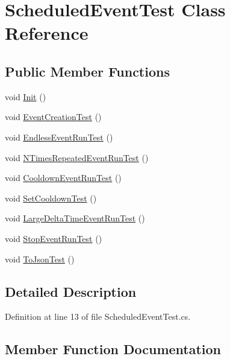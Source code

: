 \hypertarget{class_scheduled_event_test}{}\section{Scheduled\+Event\+Test Class Reference}
\label{class_scheduled_event_test}
\subsection*{Public Member Functions}
\begin{DoxyCompactItemize}
\item 
void \hyperlink{class_scheduled_event_test_a28bf66bb4e190d9b302157009e4230ba}{Init} ()
\item 
void \hyperlink{class_scheduled_event_test_a4560717049248abe6386df6bf4e26aa6}{Event\+Creation\+Test} ()
\item 
void \hyperlink{class_scheduled_event_test_aa732768471b5daf96ad4965b0ac08294}{Endless\+Event\+Run\+Test} ()
\item 
void \hyperlink{class_scheduled_event_test_a90715a23b61abbf22838d7d51a778e53}{N\+Times\+Repeated\+Event\+Run\+Test} ()
\item 
void \hyperlink{class_scheduled_event_test_a30c9f95063e2d38306990bb91d059769}{Cooldown\+Event\+Run\+Test} ()
\item 
void \hyperlink{class_scheduled_event_test_a96c7c9cc561375e7f6c971569f84f390}{Set\+Cooldown\+Test} ()
\item 
void \hyperlink{class_scheduled_event_test_adb2a5933b854be111b3c5dc119f02af7}{Large\+Delta\+Time\+Event\+Run\+Test} ()
\item 
void \hyperlink{class_scheduled_event_test_a5c3cd21fcea5c19dc23b71985850cf64}{Stop\+Event\+Run\+Test} ()
\item 
void \hyperlink{class_scheduled_event_test_a7320b6385df779ca061f9abf07175a0a}{To\+Json\+Test} ()
\end{DoxyCompactItemize}


\subsection{Detailed Description}


Definition at line 13 of file Scheduled\+Event\+Test.\+cs.



\subsection{Member Function Documentation}
\mbox{\label{class_scheduled_event_test_a30c9f95063e2d38306990bb91d059769}} 
